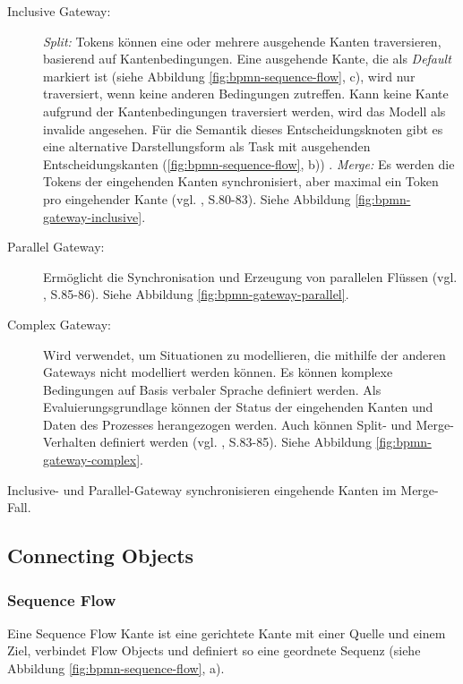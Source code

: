 \begin{description}
\item[Inclusive Gateway:] \emph{Split:} Tokens können eine oder mehrere ausgehende Kanten traversieren, basierend auf Kantenbedingungen. Eine ausgehende Kante, die als \emph{Default} markiert ist (siehe Abbildung \ref{fig:bpmn-sequence-flow}, c), wird nur traversiert, wenn keine anderen Bedingungen zutreffen. Kann keine Kante aufgrund der Kantenbedingungen traversiert werden, wird das Modell als invalide angesehen. Für die Semantik dieses Entscheidungsknoten gibt es eine alternative Darstellungsform als Task mit ausgehenden Entscheidungskanten (\ref{fig:bpmn-sequence-flow}, b)) . \emph{Merge:} Es werden die Tokens der eingehenden Kanten synchronisiert, aber maximal ein Token pro eingehender Kante (vgl. \citep{BPMN2009}, S.80-83). Siehe Abbildung \ref{fig:bpmn-gateway-inclusive}.

\item[Parallel Gateway:] Ermöglicht die Synchronisation und Erzeugung von parallelen Flüssen (vgl. \citep{BPMN2009}, S.85-86). Siehe Abbildung \ref{fig:bpmn-gateway-parallel}.

\item[Complex Gateway:] Wird verwendet, um Situationen zu modellieren, die mithilfe der anderen Gateways nicht modelliert werden können. Es können komplexe Bedingungen auf Basis verbaler Sprache definiert werden. Als Evaluierungsgrundlage können der Status der eingehenden Kanten und Daten des Prozesses herangezogen werden. Auch können Split- und Merge-Verhalten definiert werden (vgl. \citep{BPMN2009}, S.83-85). Siehe Abbildung \ref{fig:bpmn-gateway-complex}.

\end{description}
Inclusive- und Parallel-Gateway synchronisieren eingehende Kanten im Merge-Fall.


\subsection{Connecting Objects}

\subsubsection{Sequence Flow}
Eine Sequence Flow Kante ist eine gerichtete Kante mit einer Quelle und einem Ziel, verbindet Flow Objects und definiert so eine geordnete Sequenz (siehe Abbildung \ref{fig:bpmn-sequence-flow}, a).

